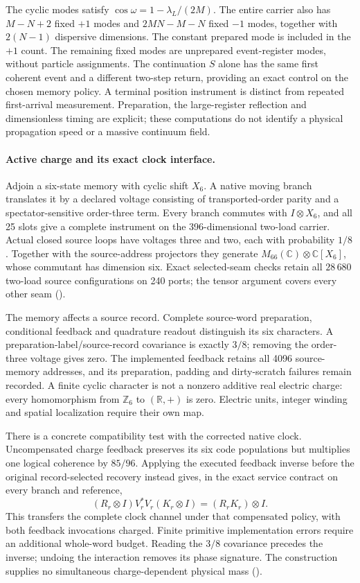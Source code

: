 The cyclic modes satisfy $\cos\omega=1-\lambda_L/(2M)$.
The entire carrier also has $M-N+2$ fixed $+1$ modes and
$2MN-M-N$ fixed $-1$ modes, together with $2(N-1)$ dispersive dimensions.
The constant prepared mode is included in the $+1$ count.  The remaining
fixed modes are unprepared event-register modes, without particle
assignments.  The continuation $S$ alone has the same first coherent
event and a different two-step return, providing an exact control on the
chosen memory policy.  A terminal position instrument is distinct from
repeated first-arrival measurement.  Preparation, the large-register
reflection and dimensionless timing are explicit; these computations do
not identify a physical propagation speed or a massive continuum field.

\paragraph{Active charge and its exact clock interface.}
Adjoin a six-state memory with cyclic shift $X_6$.  A native moving branch
translates it by a declared voltage consisting of transported-order
parity and a spectator-sensitive order-three term.  Every branch commutes
with $I\otimes X_6$, and all 25 slots give a complete instrument on the
396-dimensional two-load carrier.  Actual closed source loops have
voltages three and two, each with probability $1/8$.  Together with the
source-address projectors they generate
$M_{66}(\mathbb C)\otimes\mathbb C[X_6]$, whose commutant has dimension
six.  Exact selected-seam checks retain all $28\,680$ two-load source
configurations on 240 ports; the tensor argument covers every other seam
().

The memory affects a source record.  Complete source-word preparation,
conditional feedback and quadrature readout distinguish its six
characters.  A preparation-label/source-record covariance is exactly
$3/8$; removing the order-three voltage gives zero.  The implemented
feedback retains all 4096 source-memory addresses, and its preparation,
padding and dirty-scratch failures remain recorded.  A finite cyclic
character is not a nonzero additive real electric charge: every
homomorphism from $\mathbb Z_6$ to $(\mathbb R,+)$ is zero.  Electric units,
integer winding and spatial localization require their own map.

There is a concrete compatibility test with the corrected native clock.
Uncompensated charge feedback preserves its six code populations but
multiplies one logical coherence by $85/96$.  Applying the executed
feedback inverse before the original record-selected recovery instead
gives, in the exact service contract on every branch and reference,
\[
 (R_r\otimes I)V_r^*V_r(K_r\otimes I)
       =(R_rK_r)\otimes I.
\]
This transfers the complete clock channel under that compensated policy,
with both feedback invocations charged.  Finite primitive implementation
errors require an additional whole-word budget.  Reading the $3/8$ covariance
precedes the inverse; undoing the interaction removes its phase
signature.  The construction supplies no simultaneous charge-dependent
physical mass ().

